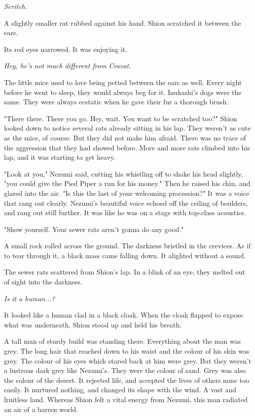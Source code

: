 \emph{Scritch}.

A slightly smaller rat rubbed against his hand. Shion scratched it
between the ears.

Its red eyes narrowed. It was enjoying it.

\emph{Hey, he's not much different from Cravat.}

The little mice used to love being petted between the ears as well.
Every night before he went to sleep, they would always beg for it.
Inukashi's dogs were the same. They were always ecstatic when he gave
their fur a thorough brush.

"There there. There you go. Hey, wait. You want to be scratched too?"
Shion looked down to notice several rats already sitting in his lap.
They weren't as cute as the mice, of course. But they did not make him
afraid. There was no trace of the aggression that they had showed
before. More and more rats climbed into his lap, and it was starting to
get heavy.

"Look at you," Nezumi said, cutting his whistling off to shake his head
slightly, "you could give the Pied Piper a run for his money." Then he
raised his chin, and glared into the air. "Is this the last of your
welcoming procession?" It was a voice that rang out clearly. Nezumi's
beautiful voice echoed off the ceiling of boulders, and rang out still
further. It was like he was on a stage with top-class acoustics.

"Show yourself. Your sewer rats aren't gonna do any good."

A small rock rolled across the ground. The darkness bristled in the
crevices. As if to tear through it, a black mass came falling down. It
alighted without a sound.

The sewer rats scattered from Shion's lap. In a blink of an eye, they
melted out of sight into the darkness.

\emph{Is it a human...?}

It looked like a human clad in a black cloak. When the cloak flapped to
expose what was underneath, Shion stood up and held his breath.

A tall man of sturdy build was standing there. Everything about the man
was grey. The long hair that reached down to his waist and the colour of
his skin was grey. The colour of his eyes which stared back at him were
grey. But they weren't a lustrous dark grey like Nezumi's. They were the
colour of sand. Grey was also the colour of the desert. It rejected
life, and accepted the lives of others none too easily. It nurtured
nothing, and changed its shape with the wind. A vast and fruitless land.
Whereas Shion felt a vital energy from Nezumi, this man radiated an air
of a barren world.


